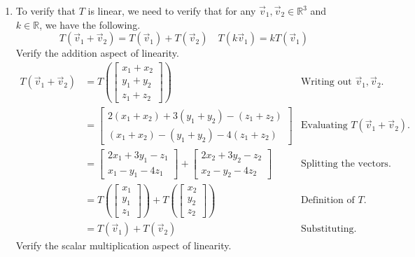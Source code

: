 \begin{SaveQuestion}
\begin{enumerate}
      \item To verify that $T$ is linear, we need to verify that for any $\vec v_1, \vec v_2 \in \mathbb{R}^3$ and $k \in \mathbb{R}$, we have the following.
      $$T(\vec v_1 + \vec v_2) = T(\vec v_1) + T(\vec v_2) \quad T(k\vec v_1) = k T(\vec v_1)$$
      Verify the addition aspect of linearity.
      \begin{align*}
          T(\vec v_1 + \vec v_2)        &= T\left(\begin{bmatrix} x_1 + x_2 \\ y_1 + y_2 \\ z_1 + z_2 \end{bmatrix}\right)                                                              &\text{Writing out $\vec v_1, \vec v_2$.} \\
                                        &= \begin{bmatrix} 2(x_1 + x_2) + 3(y_1 + y_2) - (z_1 + z_2) \\ (x_1 + x_2) - (y_1 + y_2) - 4(z_1 + z_2) \end{bmatrix}                          &\text{Evaluating $T(\vec v_1 + \vec v_2)$.} \\
                                        &= \begin{bmatrix} 2x_1 + 3y_1 - z_1 \\ x_1 - y_1 - 4z_1 \end{bmatrix} + \begin{bmatrix} 2x_2 + 3y_2 - z_2 \\ x_2 - y_2 - 4z_2 \end{bmatrix}    &\text{Splitting the vectors.} \\
                                        &= T\left(\begin{bmatrix} x_1 \\ y_1 \\ z_1 \end{bmatrix}\right) + T\left(\begin{bmatrix} x_2 \\ y_2 \\ z_2 \end{bmatrix}\right)                &\text{Definition of $T$.} \\
                                        &= T(\vec v_1) + T(\vec v_2)                                                                                                                    &\text{Substituting.}
      \end{align*}
      Verify the scalar multiplication aspect of linearity.

\end{enumerate}
\end{SaveQuestion}
